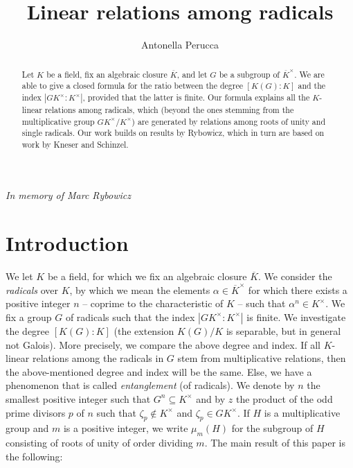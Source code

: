 \documentclass[11pt, a4paper]{amsart}
\title{Linear relations among radicals}
\author{Antonella Perucca}
\date{}
\theoremstyle{definition}
\begin{document}
\maketitle

\begin{center}
     \textit{In memory of Marc Rybowicz}
\end{center}

\begin{abstract}
Let $K$ be a field, fix an algebraic closure $\overline{K}$, and let $G$ be a subgroup of $\overline{K}^\times$. We are able to give a closed formula for the ratio between the degree $[K(G):K]$ and the index $|GK^\times:K^\times|$, provided that the latter is finite. Our formula  explains all the $K$-linear relations among radicals, which (beyond the ones stemming from the multiplicative group $GK^\times/K^\times$) are generated by relations among roots of unity and single radicals. Our work builds on results by Rybowicz, which in turn are based on work by Kneser and Schinzel. 
\end{abstract}




\section{Introduction}

We let $K$ be a field, for which we fix an algebraic closure $\overline{K}$. We consider the \emph{radicals} over $K$, by which we mean the elements $\alpha\in \overline{K}^\times$ for which there exists a positive integer $n$ -- coprime to the characteristic of $K$ -- such that $\alpha^n\in K^\times$. 
We fix a group $G$ of radicals such that the index $|GK^\times :K^\times|$ is finite. We investigate the degree $[K(G):K]$ (the extension $K(G)/K$ is separable, but in general not Galois). More precisely, we compare the above degree and  index.
If all $K$-linear relations among the radicals in $G$ stem from multiplicative relations, then the above-mentioned degree and index will be the same. Else, we have a phenomenon that is called \emph{entanglement} (of radicals). We denote by $n$ the smallest positive integer such that $G^n\subseteq K^\times$ and by $z$ the product of the odd prime divisors $p$ of $n$ such that $\zeta_p\notin K^\times$ and $\zeta_p\in GK^\times$. If $H$ is a multiplicative group and $m$ is a positive integer, we write $\mu_m(H)$ for the subgroup of $H$ consisting of roots of unity of order dividing $m$. The main result of this paper is the following:
\end{document}
